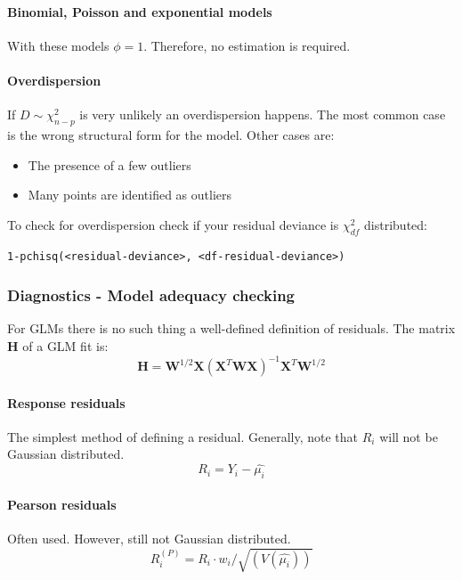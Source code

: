 \paragraph{Binomial, Poisson and exponential models}
With these models $\phi = 1$. Therefore, no estimation is required.

\paragraph{Overdispersion}

If $D \sim \chi^2_{n-p}$ is very unlikely an overdispersion happens. The most common case is the wrong structural form for the model. Other cases are:
\begin{itemize}
	\tightlist
	\item The presence of a few outliers
	\item Many points are identified as outliers
\end{itemize}

To check for overdispersion check if your residual deviance is $\chi^2_{df}$ distributed:
\begin{lstlisting}
1-pchisq(<residual-deviance>, <df-residual-deviance>)
\end{lstlisting}

\subsubsection{Diagnostics -  Model adequacy checking}
For GLMs there is no such thing a well-defined definition of residuals. The matrix $\bm{H}$ of a GLM fit is:
\begin{equation*}
\bm{H}=\bm{W}^{1/2}\bm{X}(\bm{X}^T\bm{W}\bm{X})^{-1}\bm{X}^T\bm{W}^{1/2}
\end{equation*}

\paragraph{Response residuals} The simplest method of defining a residual. Generally, note that $R_i$ will not be Gaussian distributed. 
\begin{equation*}
R_i = Y_i - \hat{\mu_i}
\end{equation*}

\paragraph{Pearson residuals}
Often used. However, still not Gaussian distributed.
\begin{equation*}
R_i^{(P)} = R_i \cdot w_i/\sqrt{(V(\hat{\mu_i}))}
\end{equation*}

